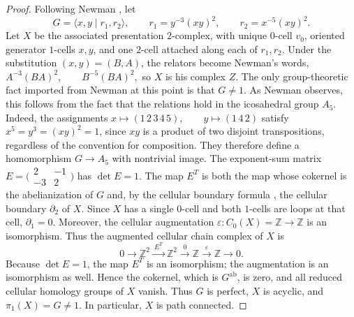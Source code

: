 \documentclass[12pt,oneside,a4paper]{article}
\theoremstyle{mytheorem}
\theoremstyle{remark}
\theoremstyle{definition}
\begin{document}
\begin{proof}
Following Newman \cite{zbMATH03054974}, let
\[
 G=\langle x,y\mid r_1,r_2\rangle,
 \qquad
 r_1=y^{-3}(xy)^2,
 \qquad
 r_2=x^{-5}(xy)^2.
\]
Let $X$ be the associated presentation $2$-complex, with unique
$0$-cell $v_0$, oriented generator $1$-cells $x,y$, and one $2$-cell
attached along each of $r_1,r_2$.
Under the substitution $(x,y)=(B,A)$, the relators become Newman's words,
$A^{-3}(BA)^2,\qquad B^{-5}(BA)^2,$
so $X$ is his complex $Z$.  The only group-theoretic fact imported from
Newman at this point is that $G\neq1$.  As Newman observes,
this follows from the fact that the relations hold in the icosahedral
group $A_5$.  Indeed, the assignments
$x\longmapsto(1\,2\,3\,4\,5),\qquad
y\longmapsto(1\,4\,2)$
satisfy $x^5=y^3=(xy)^2=1$, since $xy$ is a product of two disjoint
transpositions, regardless of the convention for composition.  They
therefore define a homomorphism $G\to A_5$ with nontrivial image.  The
exponent-sum matrix
$E=\bigl(\begin{smallmatrix}2&-1\\-3&2\end{smallmatrix}\bigr)$ has
$\det E=1$.  The map $E^T$ is both the map whose cokernel is the
abelianization of $G$ and, by the cellular boundary formula
\cite[Section~2.2, pp.~140--141]{zbMATH02103273}, the cellular boundary
$\partial_2$ of $X$.  Since $X$ has a single $0$-cell and both
$1$-cells are loops at that cell, $\partial_1=0$.  Moreover, the
cellular augmentation $\varepsilon:C_0(X)=\mathbb Z\to\mathbb Z$ is
an isomorphism.  Thus the augmented cellular chain complex of $X$ is
\[
 0\longrightarrow\mathbb Z^2
 \xrightarrow{\ E^T\ }\mathbb Z^2
 \xrightarrow{\ 0\ }\mathbb Z
 \xrightarrow{\ \varepsilon\ }\mathbb Z
 \longrightarrow0.
\]
Because \(\det E=1\), the map $E^T$ is an isomorphism; the augmentation
is an isomorphism as well.  Hence the
cokernel, which is \(G^{\mathrm{ab}}\), is zero, and all reduced cellular
homology groups of \(X\) vanish.  Thus $G$ is perfect, $X$ is acyclic,
and $\pi_1(X)=G\ne1$.  In particular, $X$ is path connected.


\end{proof}
\end{document}
